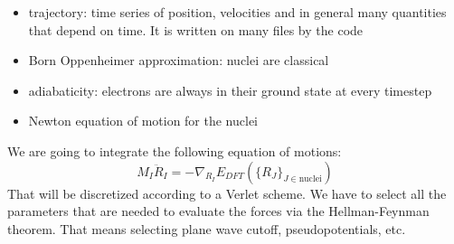 \documentclass[landscape]{foils}
\begin{document}
\begin{itemize}
\item trajectory: time series of position, velocities and in general many quantities that depend on time. It is written on many files by the code
\item Born Oppenheimer approximation: nuclei are classical
\item adiabaticity: electrons are always in their ground state at every timestep
\item Newton equation of motion for the nuclei
\end{itemize}

We are going to integrate the following equation of motions:
\begin{equation}
	M_I\ddot R_I = -\nabla_{R_I} E_{DFT}(\{R_J\}_{J\in\text{nuclei}})
\end{equation}
That will be discretized according to a Verlet scheme. We have to select all the parameters that are needed to evaluate the forces via the Hellman-Feynman theorem.
That means selecting plane wave cutoff, pseudopotentials, etc.
\end{document}
